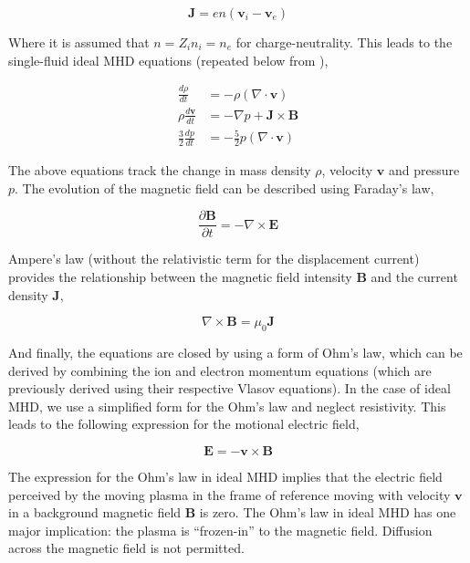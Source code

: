 \begin{equation}
    \mathbf{J} = en \left( \mathbf{v}_i - \mathbf{v}_e\right)
\end{equation}
 
Where it is assumed that $n = Z_i n_i = n_e$ for charge-neutrality. This leads to the single-fluid ideal MHD equations (repeated below from ),

\begin{align}
    \frac{d\rho}{dt} &= -\rho \left( \nabla \cdot \mathbf{v} \right)\\
    \rho \frac{d\mathbf{v}}{dt} & = -\nabla p + \mathbf{J} \times \mathbf{B} \\
    \frac{3}{2}\frac{d p}{d t}  & = - \frac{5}{2} p \left(\nabla \cdot \mathbf{v} \right)
\end{align}

The above equations track the change in mass density $\rho$, velocity $\mathbf{v}$ and pressure $p$. The evolution of the magnetic field can be described using Faraday's law,

\begin{equation}
    \frac{\partial \mathbf{B}}{\partial t} = - \nabla \times \mathbf{E}    
\end{equation}

Ampere's law (without the relativistic term for the displacement current) provides the relationship between the magnetic field intensity $\mathbf{B}$ and the current density $\mathbf{J}$,

\begin{equation}
    \nabla \times \mathbf{B} = \mu_0 \mathbf{J}    
\end{equation}

And finally, the equations are closed by using a form of Ohm's law, which can be derived by combining the ion and electron momentum equations (which are previously derived using their respective Vlasov equations). In the case of ideal MHD, we use a simplified form for the Ohm's law and neglect resistivity. This leads to the following expression for the motional electric field, 

\begin{equation}
    \mathbf{E} = -\mathbf{v} \times \mathbf{B}
\end{equation}

The expression for the Ohm's law in ideal MHD implies that the electric field perceived by the moving plasma in the frame of reference moving with velocity $\mathbf{v}$ in a background magnetic field $\mathbf{B}$ is zero. The Ohm's law in ideal MHD has one major implication: the plasma is ``frozen-in'' to the magnetic field. Diffusion across the magnetic field is not permitted. 

